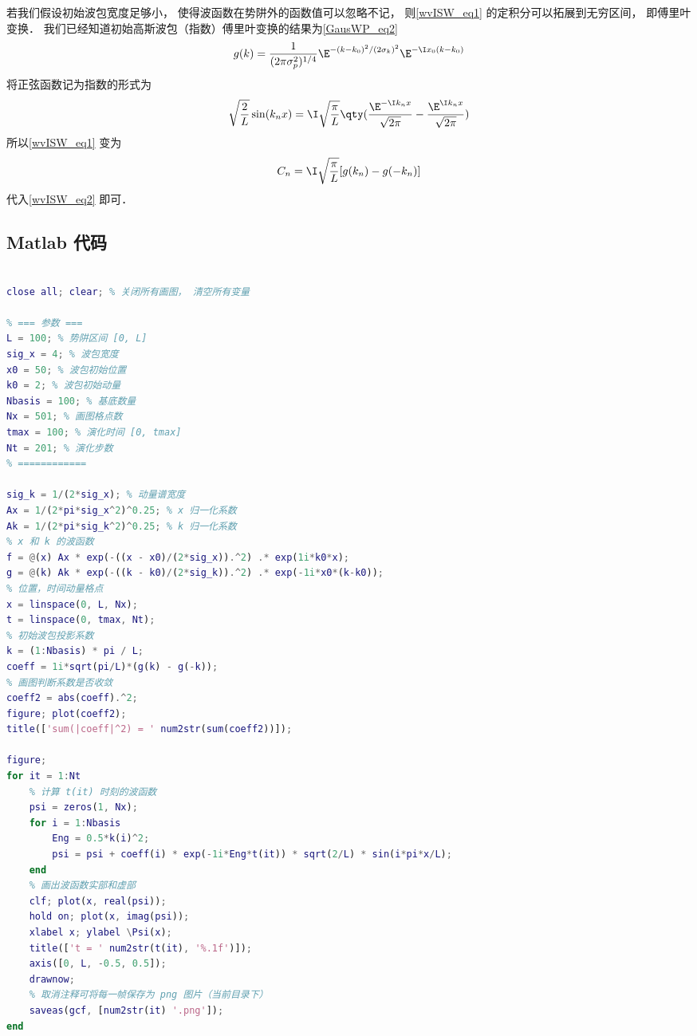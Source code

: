 若我们假设初始波包宽度足够小， 使得波函数在势阱外的函数值可以忽略不记， 则\autoref{wvISW_eq1} 的定积分可以拓展到无穷区间， 即傅里叶变换． 我们已经知道初始高斯波包（指数）傅里叶变换的结果为\autoref{GausWP_eq2}~
\begin{equation}
g(k) = \frac{1}{(2\pi \sigma _p^2)^{1/4}} \E^{-(k - k_0)^2/(2\sigma _k)^2} \E^{-\I x_0(k - k_0)}
\end{equation}
将正弦函数记为指数的形式为
\begin{equation}
\sqrt{\frac{2}{L}} \sin(k_n x) = \I \sqrt{\frac{\pi }{L}} \qty(\frac{\E^{-\I k_n x}}{\sqrt{2\pi }} - \frac{\E^{\I k_n x}}{\sqrt{2\pi }})
\end{equation}
所以\autoref{wvISW_eq1} 变为
\begin{equation}
C_n = \I \sqrt{\frac{\pi }{L}} [g(k_n) - g(-k_n)]
\end{equation}
代入\autoref{wvISW_eq2} 即可．

\subsection{Matlab 代码}

\begin{lstlisting}[language=matlab, caption=WpkISW.m]
% 无限深势阱中的波包

close all; clear; % 关闭所有画图， 清空所有变量

% === 参数 ===
L = 100; % 势阱区间 [0, L]
sig_x = 4; % 波包宽度
x0 = 50; % 波包初始位置
k0 = 2; % 波包初始动量
Nbasis = 100; % 基底数量
Nx = 501; % 画图格点数
tmax = 100; % 演化时间 [0, tmax]
Nt = 201; % 演化步数
% ============

sig_k = 1/(2*sig_x); % 动量谱宽度
Ax = 1/(2*pi*sig_x^2)^0.25; % x 归一化系数
Ak = 1/(2*pi*sig_k^2)^0.25; % k 归一化系数
% x 和 k 的波函数
f = @(x) Ax * exp(-((x - x0)/(2*sig_x)).^2) .* exp(1i*k0*x);
g = @(k) Ak * exp(-((k - k0)/(2*sig_k)).^2) .* exp(-1i*x0*(k-k0));
% 位置，时间动量格点
x = linspace(0, L, Nx);
t = linspace(0, tmax, Nt);
% 初始波包投影系数
k = (1:Nbasis) * pi / L;
coeff = 1i*sqrt(pi/L)*(g(k) - g(-k));
% 画图判断系数是否收敛
coeff2 = abs(coeff).^2;
figure; plot(coeff2);
title(['sum(|coeff|^2) = ' num2str(sum(coeff2))]);

figure;
for it = 1:Nt
    % 计算 t(it) 时刻的波函数
    psi = zeros(1, Nx);
    for i = 1:Nbasis
        Eng = 0.5*k(i)^2;
        psi = psi + coeff(i) * exp(-1i*Eng*t(it)) * sqrt(2/L) * sin(i*pi*x/L);
    end
    % 画出波函数实部和虚部
    clf; plot(x, real(psi));
    hold on; plot(x, imag(psi));
    xlabel x; ylabel \Psi(x);
    title(['t = ' num2str(t(it), '%.1f')]);
    axis([0, L, -0.5, 0.5]);
    drawnow;
    % 取消注释可将每一帧保存为 png 图片（当前目录下）
    saveas(gcf, [num2str(it) '.png']);
end
\end{lstlisting}
